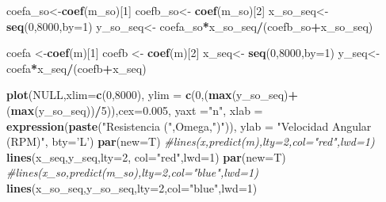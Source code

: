 \documentclass[]{article}
\newenvironment{Shaded}{\begin{snugshade}}{\end{snugshade}}
\newcommand{\KeywordTok}[1]{\textcolor[rgb]{0.13,0.29,0.53}{\textbf{#1}}}
\newcommand{\DataTypeTok}[1]{\textcolor[rgb]{0.13,0.29,0.53}{#1}}
\newcommand{\DecValTok}[1]{\textcolor[rgb]{0.00,0.00,0.81}{#1}}
\newcommand{\FloatTok}[1]{\textcolor[rgb]{0.00,0.00,0.81}{#1}}
\newcommand{\StringTok}[1]{\textcolor[rgb]{0.31,0.60,0.02}{#1}}
\newcommand{\CommentTok}[1]{\textcolor[rgb]{0.56,0.35,0.01}{\textit{#1}}}
\newcommand{\OtherTok}[1]{\textcolor[rgb]{0.56,0.35,0.01}{#1}}
\newcommand{\OperatorTok}[1]{\textcolor[rgb]{0.81,0.36,0.00}{\textbf{#1}}}
\newcommand{\NormalTok}[1]{#1}
\begin{document}
\begin{Shaded}
\begin{Highlighting}[]
{{{{{{{{{{{{    
    
    
\NormalTok{    coefa_so<-}\KeywordTok{coef}\NormalTok{(m_so)[}\DecValTok{1}\NormalTok{]}
\NormalTok{    coefb_so<-}\StringTok{ }\KeywordTok{coef}\NormalTok{(m_so)[}\DecValTok{2}\NormalTok{]}
\NormalTok{    x_so_seq<-}\StringTok{ }\KeywordTok{seq}\NormalTok{(}\DecValTok{0}\NormalTok{,}\DecValTok{8000}\NormalTok{,}\DataTypeTok{by=}\DecValTok{1}\NormalTok{)}
\NormalTok{    y_so_seq<-}\StringTok{ }\NormalTok{coefa_so}\OperatorTok{*}\NormalTok{x_so_seq}\OperatorTok{/}\NormalTok{(coefb_so}\OperatorTok{+}\NormalTok{x_so_seq)}
    
\NormalTok{    coefa <-}\KeywordTok{coef}\NormalTok{(m)[}\DecValTok{1}\NormalTok{]}
\NormalTok{    coefb <-}\StringTok{ }\KeywordTok{coef}\NormalTok{(m)[}\DecValTok{2}\NormalTok{]}
\NormalTok{    x_seq<-}\StringTok{ }\KeywordTok{seq}\NormalTok{(}\DecValTok{0}\NormalTok{,}\DecValTok{8000}\NormalTok{,}\DataTypeTok{by=}\DecValTok{1}\NormalTok{)}
\NormalTok{    y_seq<-}\StringTok{ }\NormalTok{coefa}\OperatorTok{*}\NormalTok{x_seq}\OperatorTok{/}\NormalTok{(coefb}\OperatorTok{+}\NormalTok{x_seq)}
    
    
    
    
    
    \KeywordTok{plot}\NormalTok{(}\OtherTok{NULL}\NormalTok{,}\DataTypeTok{xlim=}\KeywordTok{c}\NormalTok{(}\DecValTok{0}\NormalTok{,}\DecValTok{8000}\NormalTok{),}
         \DataTypeTok{ylim =} \KeywordTok{c}\NormalTok{(}\DecValTok{0}\NormalTok{,(}\KeywordTok{max}\NormalTok{(y_so_seq)}\OperatorTok{+}\NormalTok{(}\KeywordTok{max}\NormalTok{(y_so_seq))}\OperatorTok{/}\DecValTok{5}\NormalTok{)),}\DataTypeTok{cex=}\FloatTok{0.005}\NormalTok{, }\DataTypeTok{yaxt =}\StringTok{"n"}\NormalTok{,}
         \DataTypeTok{xlab =}  \KeywordTok{expression}\NormalTok{(}\KeywordTok{paste}\NormalTok{(}\StringTok{"Resistencia ("}\NormalTok{,Omega,}\StringTok{")"}\NormalTok{)), }\DataTypeTok{ylab =} \StringTok{"Velocidad Angular (RPM)"}\NormalTok{, }\DataTypeTok{bty=}\StringTok{'L'}\NormalTok{)}
    \KeywordTok{par}\NormalTok{(}\DataTypeTok{new=}\NormalTok{T)}
    \CommentTok{#lines(x,predict(m),lty=2,col="red",lwd=1)}
    \KeywordTok{lines}\NormalTok{(x_seq,y_seq,}\DataTypeTok{lty=}\DecValTok{2}\NormalTok{, }\DataTypeTok{col=}\StringTok{"red"}\NormalTok{,}\DataTypeTok{lwd=}\DecValTok{1}\NormalTok{)}
    \KeywordTok{par}\NormalTok{(}\DataTypeTok{new=}\NormalTok{T)}
    \CommentTok{#lines(x_so,predict(m_so),lty=2,col="blue",lwd=1)}
    \KeywordTok{lines}\NormalTok{(x_so_seq,y_so_seq,}\DataTypeTok{lty=}\DecValTok{2}\NormalTok{,}\DataTypeTok{col=}\StringTok{"blue"}\NormalTok{,}\DataTypeTok{lwd=}\DecValTok{1}\NormalTok{)}
    
}}}}}}}}}}}}
\end{Highlighting}
\end{Shaded}
\end{document}
